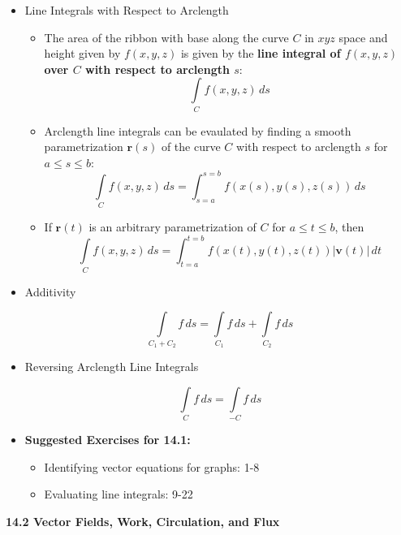 \documentclass[12pt]{article}
\renewcommand{\vec}[1]{\mathbf{#1}}
\newcommand{\dvar}[1]{\,d{#1}}
\newcommand{\<}{\left<}
\renewcommand{\>}{\right>}
\begin{document}
  \begin{itemize}
  
  \item Line Integrals with Respect to Arclength
  
    \begin{itemize}
    \item The area of the ribbon with base along the curve $C$ in $xyz$ space and height given by $f(x,y,z)$ is given by the \textbf{line integral of $f(x,y,z)$ over $C$ with respect to arclength $s$}: \[\int\limits_C f(x,y,z)\dvar{s}\]
    \item Arclength line integrals can be evaulated by finding a smooth parametrization $\vec{r}(s)$ of the curve $C$ with respect to arclength $s$ for $a\leq s \leq b$: \[\int\limits_C f(x,y,z)\dvar{s} = \int_{s=a}^{s=b} f(x(s),y(s),z(s))\dvar{s}\]
    \item If $\vec{r}(t)$ is an arbitrary parametrization of $C$ for $a \leq t \leq b$, then \[\int\limits_C f(x,y,z)\dvar{s}=\int_{t=a}^{t=b} f(x(t),y(t),z(t))|\vec{v}(t)|\dvar{t}\]
    \end{itemize}
    
  \item Additivity

   \[\int\limits_{C_1+C_2} f\dvar{s}=\int\limits_{C_1}f\dvar{s}+\int\limits_{C_2}f\dvar{s}\]

  \item Reversing Arclength Line Integrals

  \[\int\limits_{C} f\dvar{s} = \int\limits_{-C} f\dvar{s}\]
        
  \item \textbf{Suggested Exercises for 14.1:}
  
    \begin{itemize}
    \item Identifying vector equations for graphs: 1-8
    \item Evaluating line integrals: 9-22
    \end{itemize}
    
  \end{itemize}
  
  \newpage
  
  \centerline{\bf 14.2 Vector Fields, Work, Circulation, and Flux}
  
\end{document}
